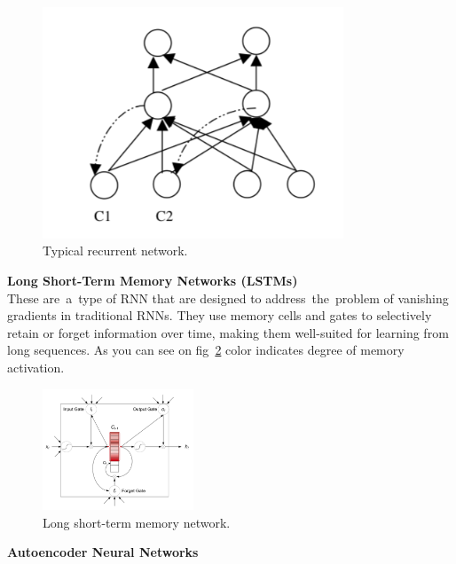     \begin{center}
        \begin{figure}[!ht]
            \centering
            \includegraphics[width=0.8\textwidth]{figures/rn}
            \caption{Typical recurrent network. \cite{medsker2001recurrent}}
            \label{fig:rn}
        \end{figure}
    \end{center}
\textbf{Long Short-Term Memory Networks (LSTMs)}\\
These are~a~type of RNN that are designed to address~the~problem of vanishing gradients in traditional RNNs. They use memory cells and gates to selectively retain or forget information over time, making them well-suited for learning from long sequences. As you can see on fig~\ref{fig:ltmn} color indicates degree of memory activation.
    \begin{center}
        \begin{figure}[!ht]
            \centering
            \includegraphics[width=0.4\textwidth]{figures/ltmn}
            \caption{Long short-term memory network. \cite{cheng2016long}}
            \label{fig:ltmn}
        \end{figure}
    \end{center}
\textbf{Autoencoder Neural Networks}\\
